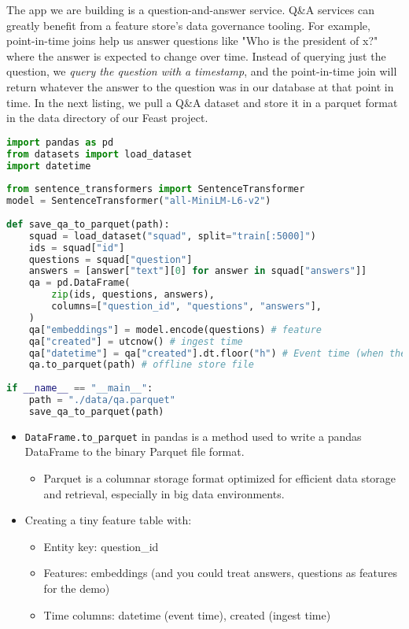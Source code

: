 The app we are building is a question-and-answer service. Q\&A services can greatly benefit from a feature store's data governance tooling. For example, point-in-time joins help us answer questions like "Who is the president of x?" where the answer is expected to change over time. Instead of querying just the question, we \textit{query the question with a timestamp}, and the point-in-time join will return whatever the answer to the question was in our database at that point in time. In the next listing, we pull a Q\&A dataset and store it in a parquet format in the data directory of our Feast project.
\begin{lstlisting}[language=Python]
import pandas as pd
from datasets import load_dataset
import datetime
 
from sentence_transformers import SentenceTransformer
model = SentenceTransformer("all-MiniLM-L6-v2")
 
def save_qa_to_parquet(path):
    squad = load_dataset("squad", split="train[:5000]")   
    ids = squad["id"]                            
    questions = squad["question"]
    answers = [answer["text"][0] for answer in squad["answers"]]
    qa = pd.DataFrame(          
        zip(ids, questions, answers),
        columns=["question_id", "questions", "answers"],
    )
    qa["embeddings"] = model.encode(questions) # feature
    qa["created"] = utcnow() # ingest time
    qa["datetime"] = qa["created"].dt.floor("h") # Event time (when the new fact becomes true)
    qa.to_parquet(path) # offline store file
 
if __name__ == "__main__":
    path = "./data/qa.parquet"
    save_qa_to_parquet(path)
\end{lstlisting}
\begin{itemize}
	\item \texttt{DataFrame.to\_parquet} in pandas is a method used to write a pandas DataFrame to the binary Parquet file format.
		\begin{itemize}
			\item Parquet is a columnar storage format optimized for efficient data storage and retrieval, especially in big data environments.
		\end{itemize}
	\item Creating a tiny feature table with:
		\begin{itemize}
			\item Entity key: question\_id
			\item Features: embeddings (and you could treat answers, questions as features for the demo)
			\item Time columns: datetime (event time), created (ingest time)
		\end{itemize}
		
\end{itemize}

